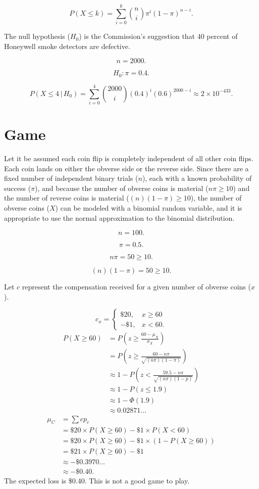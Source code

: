\documentclass[12pt]{article}
\begin{document}
\[P(X\leq k)=\sum^{k}_{i=0}{\binom{n}{i}\pi^i(1-\pi)^{n-i}}.\]

The null hypothesis ($H_0$) is the Commission's suggestion that 40 percent of Honeywell smoke detectors are defective.

\[n=2000.\]

\[H_0: \pi=0.4.\]

\[P(X\leq 4\,|\,H_0)=\sum^{4}_{i=0}{\binom{2000}{i}(0.4)^i(0.6)^{2000-i}}\approx 2\times 10^{-433}.\]
\section{Game}
Let it be assumed each coin flip is completely independent of all other coin flips. Each coin lands on either the obverse side or the reverse side. Since there are a fixed number of independent binary trials ($n$), each with a known probability of success ($\pi$), and because the number of obverse coins is material ($n\pi\geq 10$) and the number of reverse coins is material ($(n)(1-\pi)\geq 10$), the number of obverse coins ($X$) can be modeled with a binomial random variable, and it is appropriate to use the normal approximation to the binomial distribution.

\[n=100.\]

\[\pi=0.5.\]

\[n\pi=50\geq 10.\]

\[(n)(1-\pi)=50\geq 10.\]

Let $c$ represent the compensation received for a given number of obverse coins ($x$).

\begin{equation*}
c_x=\begin{cases}
    \$20,&x\geq 60\\
    -\$1,&x<60.
\end{cases}
\end{equation*}
\begin{align*}
P(X\geq 60)
&=P\left(z\geq\frac{60-\mu_X}{\sigma_X}\right)\\
&=P\left(z\geq\frac{60-n\pi}{\sqrt{(n\pi)(1-\pi)}}\right)\\
&\approx 1-P\left(z<\frac{59.5-n\pi}{\sqrt{(n\pi)(1-p)}}\right)\\
&\approx 1-P(z\leq 1.9)\\
&\approx 1-\Phi(1.9)\\
&\approx 0.02871\dots
\end{align*}
\begin{align*}
\mu_C
&=\sum{cp_{c}}\\
&=\$20\times P(X\geq 60)-\$1\times P(X<60)\\
&=\$20\times P(X\geq 60)-\$1\times(1-P(X\geq 60))\\
&=\$21\times P(X\geq 60)-\$1\\
&\approx-\$0.3970\dots\\
&\approx-\$0.40.
\end{align*}
The expected loss is \$0.40. This is not a good game to play.
\end{document}
